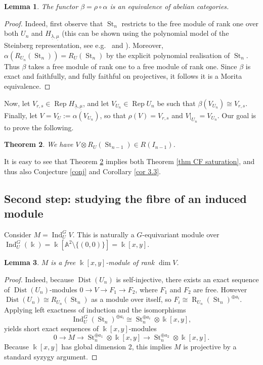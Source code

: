 \documentclass[11pt]{amsart}
\def\dim{\operatorname{dim}}
\def\Ind{\operatorname{Ind}}
\def\A{\mathbb{A}}
\def\A{\mathbb{A}}
\def\Rep{\operatorname{Rep}}
\newtheorem{thm}{Theorem}[section]
\newtheorem{lemma}[thm]{Lemma}
\theoremstyle{definition}
\theoremstyle{remark}
\numberwithin{equation}{section}
\begin{document}
\begin{lemma}
    The functor $\beta=\rho\circ\alpha$ is an equivalence of abelian categories.
\end{lemma}
\begin{proof}
    Indeed, first observe that $\operatorname{St}_n$ restricts to the free module of rank one over both $U_n$ and $H_{\underline{\lambda},\underline{\mu}}$ (this can be shown using the polynomial model of the Steinberg representation, see e.g.~\cite[\S 5.3]{CF} and \cite[Lem.~3.2]{CF2}).  Moreover, $\alpha(R_{U_n}(\operatorname{St}_n))=R_U(\operatorname{St}_n)$ by the explicit polynomial realisation of $\operatorname{St}_{n}$.  Thus $\beta$ takes a free module of rank one to a free module of rank one.  Since $\beta$ is exact and faithfully, and fully faithful on projectives, it follows it is a Morita equivalence.
\end{proof}

Now, let $V_{r,s}\in\Rep H_{\underline{\lambda},\underline{\mu}}$, and let $V_{U_n}\in\Rep U_n$ be such that $\beta(V_{U_n})\cong V_{r,s}$.  Finally, let $V=V_U:=\alpha(V_{U_n})$, so that $\rho(V)=V_{r,s}$ and $V|_{U_n}=V_{U_n}$. Our goal is to prove the following.
\begin{thm}\label{thm stronger}
    We have $V\otimes R_U(\operatorname{St}_{n-1})\in R( I_{n-1})$.
\end{thm}

It is easy to see that Theorem \ref{thm stronger} implies both Theorem \ref{thm CF saturation}, and thus also Conjecture \ref{conj} and Corollary \ref{cor 3.3}.

\subsection{Second step: studying the fibre of an induced module}

Consider $M=\Ind_{U}^{G}V.$  This is naturally a $G$-equivariant module over $\Ind_U^G(\Bbbk)=\Bbbk[\A^2\setminus\{(0,0)\}]=\Bbbk[x,y]$.  

\begin{lemma}
    $M$ is a free $\Bbbk[x,y]$-module of rank $\dim V$.
\end{lemma}

\begin{proof}
    Indeed, because $\operatorname{Dist}(U_n)$ is self-injective, there exists an exact sequence of $\operatorname{Dist}(U_n)$-modules $0\to V\to F_1\to F_2$, where $F_1$ and $F_2$ are free.  However $\operatorname{Dist}(U_n)\cong R_{U_n}(\operatorname{St}_{n})$ as a module over itself, so $F_i\cong\operatorname{R}_{U_n}(\operatorname{St}_{n})^{\oplus a_i}$.  Applying left exactness of induction and the isomorphisms
    \[
    \Ind_U^G(\operatorname{St}_n)^{\oplus a_i}\cong \operatorname{St}_n^{\oplus a_i}\otimes\Bbbk[x,y],
    \]
    yields short exact sequences of $\Bbbk[x,y]$-modules
    \[
    0\to M\to \operatorname{St}_n^{\oplus a_1}\otimes\Bbbk[x,y]\to \operatorname{St}_n^{\oplus a_2}\otimes\Bbbk[x,y].
    \]
    Because $\Bbbk[x,y]$ has global dimension 2, this implies $M$ is projective by a standard syzygy argument.
\end{proof}
\end{document}

